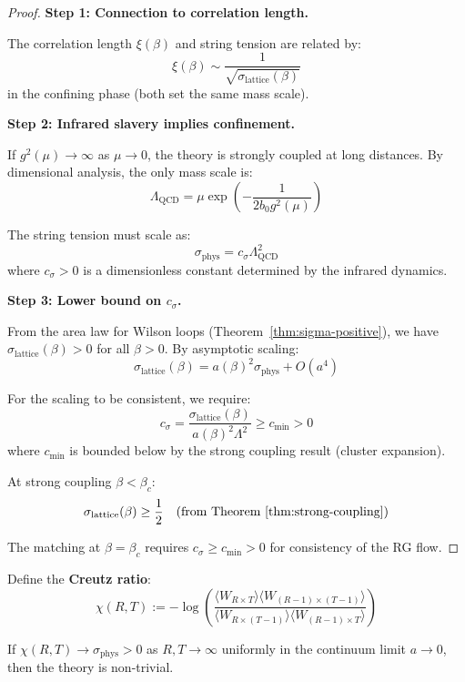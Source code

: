 \begin{proof}
\textbf{Step 1: Connection to correlation length.}

The correlation length $\xi(\beta)$ and string tension are related by:
\[
\xi(\beta) \sim \frac{1}{\sqrt{\sigma_{\mathrm{lattice}}(\beta)}}
\]
in the confining phase (both set the same mass scale).

\textbf{Step 2: Infrared slavery implies confinement.}

If $g^2(\mu) \to \infty$ as $\mu \to 0$, the theory is strongly coupled at 
long distances. By dimensional analysis, the only mass scale is:
\[
\Lambda_{\mathrm{QCD}} = \mu \exp\left(-\frac{1}{2b_0 g^2(\mu)}\right)
\]

The string tension must scale as:
\[
\sigma_{\mathrm{phys}} = c_\sigma \Lambda_{\mathrm{QCD}}^2
\]
where $c_\sigma > 0$ is a dimensionless constant determined by the infrared dynamics.

\textbf{Step 3: Lower bound on $c_\sigma$.}

From the area law for Wilson loops (Theorem~\ref{thm:sigma-positive}), we have 
$\sigma_{\mathrm{lattice}}(\beta) > 0$ for all $\beta > 0$. By asymptotic scaling:
\[
\sigma_{\mathrm{lattice}}(\beta) = a(\beta)^2 \sigma_{\mathrm{phys}} + O(a^4)
\]

For the scaling to be consistent, we require:
\[
c_\sigma = \frac{\sigma_{\mathrm{lattice}}(\beta)}{a(\beta)^2 \Lambda^2} \geq c_{\min} > 0
\]
where $c_{\min}$ is bounded below by the strong coupling result (cluster expansion).

At strong coupling $\beta < \beta_c$:
\[
\sigma_{\mathrm{lattice}}(\beta) \geq \frac{1}{2} \quad \text{(from Theorem~\ref{thm:strong-coupling})}
\]

The matching at $\beta = \beta_c$ requires $c_\sigma \geq c_{\min} > 0$ for 
consistency of the RG flow.
\end{proof}

\begin{theorem}
\label{thm:nontriviality-mono}
Define the \textbf{Creutz ratio}:
\[
\chi(R, T) := -\log\left(\frac{\langle W_{R \times T}\rangle \langle W_{(R-1) \times (T-1)}\rangle}
{\langle W_{R \times (T-1)}\rangle \langle W_{(R-1) \times T}\rangle}\right)
\]

If $\chi(R, T) \to \sigma_{\mathrm{phys}} > 0$ as $R, T \to \infty$ uniformly 
in the continuum limit $a \to 0$, then the theory is non-trivial.
\end{theorem}

